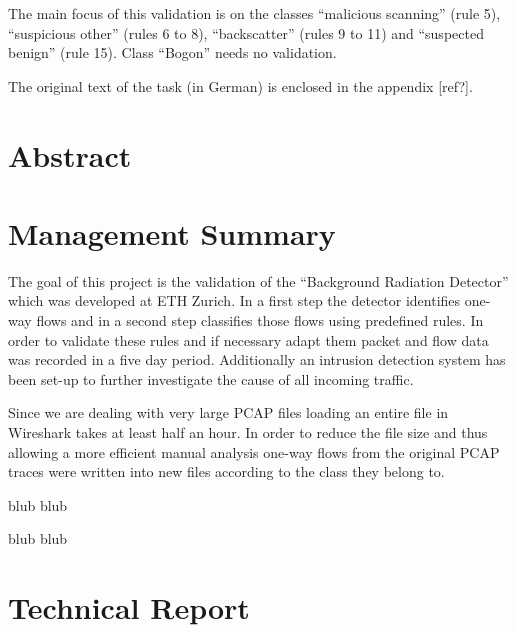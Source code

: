 \documentclass[a4paper]{scrartcl}
\begin{document}
The main focus of this validation is on the classes ``malicious scanning'' (rule 5), ``suspicious other'' (rules 6 to 8), ``backscatter'' (rules 9 to 11) and ``suspected benign'' (rule 15). Class ``Bogon'' needs no validation.

The original text of the task (in German) is enclosed in the appendix [ref?].
\newpage

\section{Abstract}

\section{Management Summary}
The goal of this project is the validation of the ``Background Radiation Detector'' which was developed at ETH Zurich. In a first step the detector identifies one-way flows and in a second step classifies those flows using predefined rules. In order to validate these rules and if necessary adapt them packet and flow data was recorded in a five day period. Additionally an intrusion detection system has been set-up to further investigate the cause of all incoming traffic.

Since we are dealing with very large PCAP files loading an entire file in Wireshark takes at least half an hour. In order to reduce the file size and thus allowing a more efficient manual analysis one-way flows from the original PCAP traces were written into new files according to the class they belong to.


blub  blub

blub  blub

\section{Technical Report}
\end{document}
